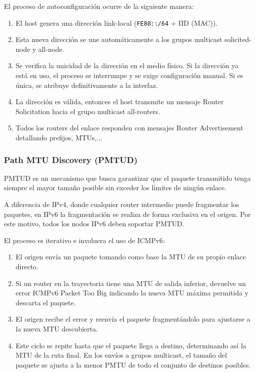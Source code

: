 El proceso de autoconfiguración ocurre de la siguiente manera:
\begin{enumerate}
  \item El host genera una dirección link-local (\texttt{FE80::/64} + IID (MAC)).
  \item Esta nueva dirección se une automáticamente a los grupos multicast solicited-node y all-node.
  \item Se verifica la unicidad de la dirección en el medio físico. Si la dirección ya está en uso, el proceso se interrumpe y se exige configuración manual. Si es única, se atribuye definitivamente a la interfaz.
  \item La dirección es válida, entonces el host transmite un mensaje Router Solicitation hacia el grupo multicast all-routers.
  \item Todos los routers del enlace responden con mensajes Router Advertisement detallando prefijos, MTUs,...
\end{enumerate}

\subsubsection{Path MTU Discovery (PMTUD)}

PMTUD es un mecanismo que busca garantizar que el paquete transmitido tenga siempre el mayor tamaño posible sin exceder los límites de ningún enlace. 

A diferencia de IPv4, donde cualquier router intermedio puede fragmentar los paquetes, en IPv6 la fragmentación se realiza de forma exclusiva en el origen. Por este motivo, todos los nodos IPv6 deben soportar PMTUD. 

El proceso es iterativo e involucra el uso de ICMPv6:
\begin{enumerate}
  \item El origen envía un paquete tomando como base la MTU de su propio enlace directo.
  \item Si un router en la trayectoria tiene una MTU de salida inferior, devuelve un error ICMPv6 Packet Too Big indicando la nueva MTU máxima permitida y descarta el paquete.
  \item El origen recibe el error y reenvía el paquete fragmentándolo para ajustarse a la nueva MTU descubierta.
  \item Este ciclo se repite hasta que el paquete llega a destino, determinando así la MTU de la ruta final. En los envíos a grupos multicast, el tamaño del paquete se ajusta a la menor PMTU de todo el conjunto de destinos posibles.
\end{enumerate}

